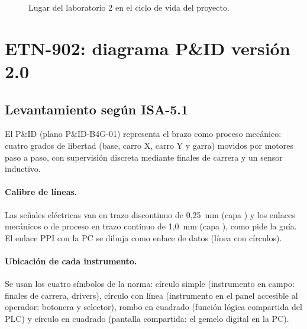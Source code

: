 \documentclass[a4paper,11pt]{article}
\begin{document}
\begin{figure}[H]
\centering
{}
\caption{Lugar del laboratorio 2 en el ciclo de vida del proyecto.}
\end{figure}

\section{ETN-902: diagrama P\&ID versión 2.0}
\subsection{Levantamiento según ISA-5.1}
El P\&ID (plano P\&ID-B4G-01) representa el brazo como proceso mecánico: cuatro grados de libertad (base, carro X, carro Y y garra) movidos por motores paso a paso, con supervisión discreta mediante finales de carrera y un sensor inductivo.


\paragraph{Calibre de líneas.} Las señales eléctricas van en trazo discontinuo de 0,25~mm (capa ) y los enlaces mecánicos o de proceso en trazo continuo de 1,0~mm (capa ), como pide la guía. El enlace PPI con la PC se dibuja como enlace de datos (línea con círculos).

\paragraph{Ubicación de cada instrumento.} Se usan los cuatro símbolos de la norma: círculo simple (instrumento en campo: finales de carrera, drivers), círculo con línea (instrumento en el panel accesible al operador: botonera y selector), rombo en cuadrado (función lógica compartida del PLC) y círculo en cuadrado (pantalla compartida: el gemelo digital en la PC).
\end{document}
